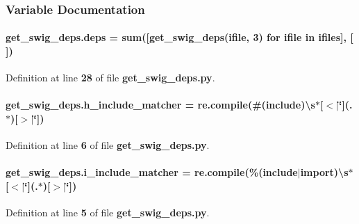 \subsubsection{Variable Documentation}
\paragraph[{deps}]{\setlength{\rightskip}{0pt plus 5cm}get\+\_\+swig\+\_\+deps.\+deps = sum([{\bf get\+\_\+swig\+\_\+deps}(ifile, 3) for ifile in {\bf ifiles}], [$\,$])}\label{namespaceget__swig__deps_a346a041dcaa05f1327cae24109d5882b}


Definition at line {\bf 28} of file {\bf get\+\_\+swig\+\_\+deps.\+py}.

\paragraph[{h\+\_\+include\+\_\+matcher}]{\setlength{\rightskip}{0pt plus 5cm}get\+\_\+swig\+\_\+deps.\+h\+\_\+include\+\_\+matcher = re.\+compile(\textquotesingle{}\#({\bf include})\textbackslash{}s$\ast$[$<$$\vert$\char`\"{}](.$\ast$)[$>$$\vert$\char`\"{}]\textquotesingle{})}\label{namespaceget__swig__deps_a54e02dd338ff5da20b5cbf0b3f7a0727}


Definition at line {\bf 6} of file {\bf get\+\_\+swig\+\_\+deps.\+py}.

\paragraph[{i\+\_\+include\+\_\+matcher}]{\setlength{\rightskip}{0pt plus 5cm}get\+\_\+swig\+\_\+deps.\+i\+\_\+include\+\_\+matcher = re.\+compile(\textquotesingle{}\%({\bf include}$\vert$import)\textbackslash{}s$\ast$[$<$$\vert$\char`\"{}](.$\ast$)[$>$$\vert$\char`\"{}]\textquotesingle{})}\label{namespaceget__swig__deps_aed3d5b5c71f9706f14da762ba7d336d8}


Definition at line {\bf 5} of file {\bf get\+\_\+swig\+\_\+deps.\+py}.


